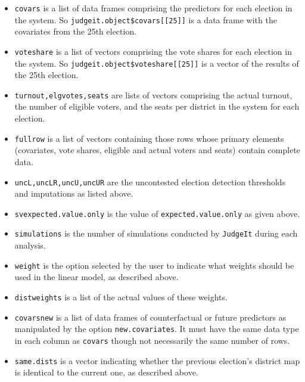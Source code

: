 \documentclass[oneside,letterpaper,titlepage]{article}
\begin{document}
\begin{itemize}

\item \texttt{covars} is a list of data frames comprising the
  predictors for each election in the system. So
  \texttt{judgeit.object\$covars[[25]]} is a data frame with the
  covariates from the 25th election.

\item \texttt{voteshare} is a list of vectors comprising the vote
  shares for each election in the system. So
  \texttt{judgeit.object\$voteshare[[25]]} is a vector of the results
  of the 25th election.

\item \texttt{turnout,elgvotes,seats} are lists of vectors
  comprising the actual turnout, the number of eligible voters, and
  the seats per district in the system for each election.

\item \texttt{fullrow} is a list of vectors containing those rows
  whose primary elements (covariates, vote shares, eligible and actual
  voters and seats) contain complete data.

\item \texttt{uncL,uncLR,uncU,uncUR} are the uncontested election
  detection thresholds and imputations as listed above.

\item \texttt{svexpected.value.only} is the value of \texttt{expected.value.only}
as given above.

\item \texttt{simulations} is the number of simulations conducted by
  \texttt{JudgeIt} during each analysis.

\item \texttt{weight} is the option selected by the user to indicate
  what weights should be used in the linear model, as described above.

\item \texttt{distweights} is a list of the actual values of these
  weights.

\item \texttt{covarsnew} is a list of data frames of counterfactual or
  future predictors as manipulated by the option
  \texttt{new.covariates}. It must have the same data type in each column as \texttt{covars} though not necessarily the same number of rows.

\item \texttt{same.dists} is a vector indicating whether the previous
  election's district map is identical to the current one, as
  described above.


\end{itemize}
\end{document}
